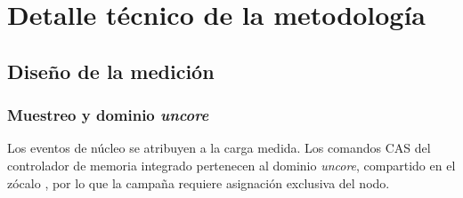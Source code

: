 \chapter{Detalle técnico de la metodología}
\label{anexo:metodologia}

\section{Diseño de la medición}

\subsection{Muestreo y dominio \textit{uncore}} 
\label{sec:uncore}

Los eventos de núcleo se atribuyen a la carga medida. Los comandos CAS del controlador de memoria integrado pertenecen al dominio \textit{uncore}, compartido en el zócalo \cite{IntelUncore2021}, por lo que la campaña requiere asignación exclusiva del nodo.

